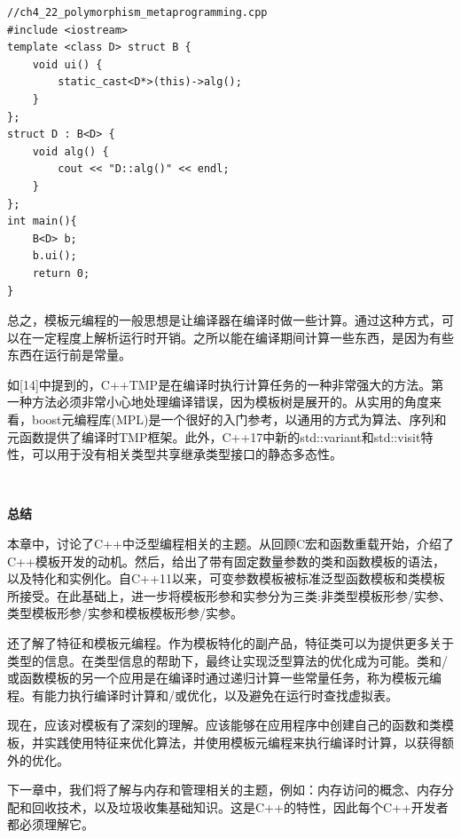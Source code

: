 \begin{lstlisting}[caption={}]
//ch4_22_polymorphism_metaprogramming.cpp
#include <iostream>
template <class D> struct B {
	void ui() {
		static_cast<D*>(this)->alg();
	}
};
struct D : B<D> {
	void alg() {
		cout << "D::alg()" << endl;
	}
};
int main(){
	B<D> b;
	b.ui();
	return 0;
}	
\end{lstlisting}

总之，模板元编程的一般思想是让编译器在编译时做一些计算。通过这种方式，可以在一定程度上解析运行时开销。之所以能在编译期间计算一些东西，是因为有些东西在运行前是常量。 \par
如[14]中提到的，C++TMP是在编译时执行计算任务的一种非常强大的方法。第一种方法必须非常小心地处理编译错误，因为模板树是展开的。从实用的角度来看，boost元编程库(MPL)是一个很好的入门参考，以通用的方式为算法、序列和元函数提供了编译时TMP框架。此外，C++17中新的std::variant和std::visit特性，可以用于没有相关类型共享继承类型接口的静态多态性。 \par

\noindent\textbf{}\ \par
\textbf{总结} \ \par
本章中，讨论了C++中泛型编程相关的主题。从回顾C宏和函数重载开始，介绍了C++模板开发的动机。然后，给出了带有固定数量参数的类和函数模板的语法，以及特化和实例化。自C++11以来，可变参数模板被标准泛型函数模板和类模板所接受。在此基础上，进一步将模板形参和实参分为三类:非类型模板形参/实参、类型模板形参/实参和模板模板形参/实参。 \par
还了解了特征和模板元编程。作为模板特化的副产品，特征类可以为提供更多关于类型的信息。在类型信息的帮助下，最终让实现泛型算法的优化成为可能。类和/或函数模板的另一个应用是在编译时通过递归计算一些常量任务，称为模板元编程。有能力执行编译时计算和/或优化，以及避免在运行时查找虚拟表。 \par
现在，应该对模板有了深刻的理解。应该能够在应用程序中创建自己的函数和类模板，并实践使用特征来优化算法，并使用模板元编程来执行编译时计算，以获得额外的优化。 \par
下一章中，我们将了解与内存和管理相关的主题，例如：内存访问的概念、内存分配和回收技术，以及垃圾收集基础知识。这是C++的特性，因此每个C++开发者都必须理解它。 \par


